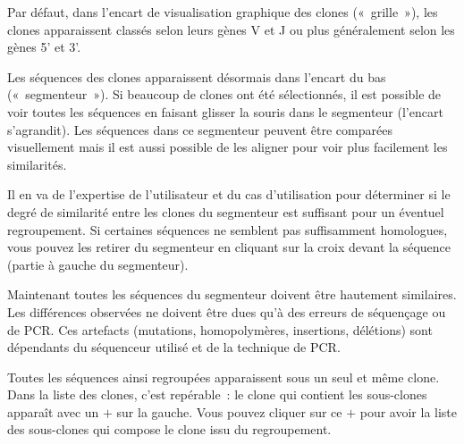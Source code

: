 \documentclass[10pt]{article}
\begin{document}
Par défaut, dans l'encart de visualisation graphique des clones
(«~grille~»), les clones apparaissent classés selon leurs gènes V et J
ou plus généralement selon les gènes 5' et 3'.


Les séquences des clones apparaissent désormais dans l'encart du bas
(«~segmenteur~»). Si beaucoup de clones ont été sélectionnés, il est
possible de voir toutes les séquences en faisant glisser la souris dans
le segmenteur (l'encart s'agrandit). Les séquences dans ce segmenteur
peuvent être comparées visuellement mais il est aussi possible de les
aligner pour voir plus facilement les similarités.

Il en va de l'expertise de l'utilisateur et du cas d'utilisation pour déterminer si le degré de
similarité entre les clones du segmenteur est suffisant pour un éventuel
regroupement. Si certaines séquences ne semblent pas suffisamment homologues,
vous pouvez les retirer du segmenteur en cliquant sur la croix devant la
séquence (partie à gauche du segmenteur).


Maintenant toutes les séquences du segmenteur doivent être hautement
similaires. Les différences observées ne doivent être dues qu'à des
erreurs de séquençage ou de PCR. Ces artefacts (mutations,
homopolymères, insertions, délétions) sont dépendants du séquenceur
utilisé et de la technique de PCR.


Toutes les séquences ainsi regroupées apparaissent sous un seul et même
clone. Dans la liste des clones, c'est repérable~: le clone qui contient
les sous-clones apparaît avec un $+$ sur la gauche. Vous pouvez
cliquer sur ce $+$ pour avoir la liste des sous-clones qui compose le
clone issu du regroupement.

\end{document}
